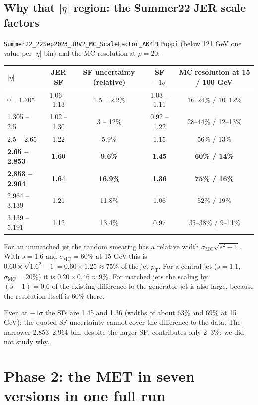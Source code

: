 \documentclass[11pt,a4paper]{article}
\newcommand{\pt}{$p_\mathrm{T}$}
\newcommand{\aeta}{$|\eta|$}
\begin{document}
\subsection{Why that \aeta{} region: the Summer22 JER scale factors}
\label{sec:sf}
\texttt{Summer22\_22Sep2023\_JRV2\_MC\_ScaleFactor\_AK4PFPuppi} (below 121 GeV one value per \aeta{} bin) and the MC resolution at $\rho = 20$:
\begin{center}
\small
\begin{tabular}{l c c c c}
\toprule
\aeta & JER SF & SF uncertainty (relative) & SF $-1\sigma$ & MC resolution at 15 / 100 GeV \\
\midrule
0 -- 1.305 & 1.06 -- 1.13 & 1.5 -- 2.2\% & 1.03 -- 1.11 & 16--24\% / 10--12\% \\
1.305 -- 2.5 & 1.02 -- 1.30 & 3 -- 12\% & 0.92 -- 1.22 & 28--44\% / 12--13\% \\
2.5 -- 2.65 & 1.22 & 5.9\% & 1.15 & 56\% / 13\% \\
\textbf{2.65 -- 2.853} & \textbf{1.60} & \textbf{9.6\%} & \textbf{1.45} & \textbf{60\% / 14\%} \\
\textbf{2.853 -- 2.964} & \textbf{1.64} & \textbf{16.9\%} & \textbf{1.36} & \textbf{75\% / 16\%} \\
2.964 -- 3.139 & 1.21 & 11.8\% & 1.06 & 52\% / 19\% \\
3.139 -- 5.191 & 1.12 & 13.4\% & 0.97 & 35--38\% / 9--11\% \\
\bottomrule
\end{tabular}
\end{center}
For an unmatched jet the random smearing has a relative width $\sigma_\mathrm{MC}\sqrt{s^2-1}$. With $s = 1.6$ and
$\sigma_\mathrm{MC} = 60\%$ at 15 GeV this is $0.60\times\sqrt{1.6^2-1} = 0.60\times1.25 \approx 75\%$ of the jet \pt.
For a central jet ($s = 1.1$, $\sigma_\mathrm{MC} = 20\%$) it is $0.20\times0.46 \approx 9\%$. For matched jets the scaling by
$(s-1) = 0.6$ of the existing difference to the generator jet is also large, because the resolution itself is 60\% there.

Even at $-1\sigma$ the SFs are 1.45 and 1.36 (widths of about 63\% and 69\% at 15 GeV): the quoted SF uncertainty cannot
cover the difference to the data. The narrower 2.853--2.964 bin, despite the larger SF, contributes only 2--3\%; we did not
study why.

\section{Phase 2: the MET in seven versions in one full run}
\label{sec:p2}
\end{document}
